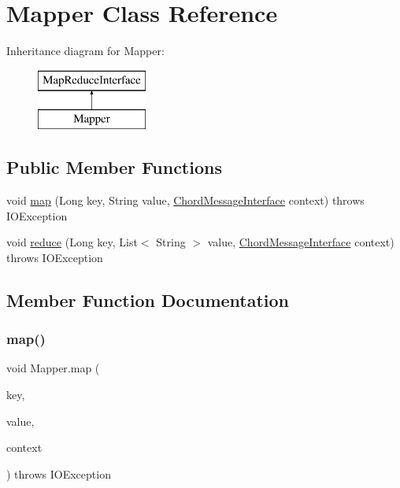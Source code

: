 \hypertarget{class_mapper}{}\section{Mapper Class Reference}
\label{class_mapper}
Inheritance diagram for Mapper\+:\begin{figure}[H]
\begin{center}
\leavevmode
\includegraphics[height=2.000000cm]{class_mapper}
\end{center}
\end{figure}
\subsection*{Public Member Functions}
\begin{DoxyCompactItemize}
\item 
void \mbox{\hyperlink{class_mapper_ad694fe6234676a05e2ee63aec14942c8}{map}} (Long key, String value, \mbox{\hyperlink{interface_chord_message_interface}{Chord\+Message\+Interface}} context)  throws I\+O\+Exception 	
\item 
void \mbox{\hyperlink{class_mapper_a5c6a53e9cd1419e4b5eded401331c2fd}{reduce}} (Long key, List$<$ String $>$ value, \mbox{\hyperlink{interface_chord_message_interface}{Chord\+Message\+Interface}} context)  throws I\+O\+Exception 	
\end{DoxyCompactItemize}


\subsection{Member Function Documentation}
\mbox{\label{class_mapper_ad694fe6234676a05e2ee63aec14942c8}} 
\subsubsection{\texorpdfstring{map()}{map()}}
{\footnotesize\ttfamily void Mapper.\+map (\begin{DoxyParamCaption}\item[{Long}]{key,  }\item[{String}]{value,  }\item[{\mbox{\hyperlink{interface_chord_message_interface}{Chord\+Message\+Interface}}}]{context }\end{DoxyParamCaption}) throws I\+O\+Exception\hspace{0.3cm}{\ttfamily [inline]}}

